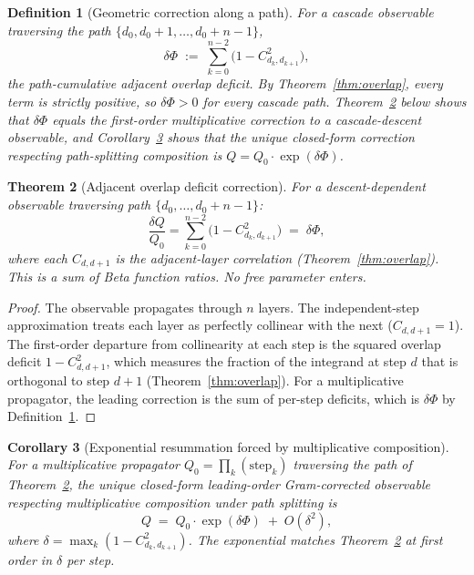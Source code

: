 \documentclass[12pt,a4paper]{article}
\newtheorem{theorem}{Theorem}[section]
\newtheorem{corollary}[theorem]{Corollary}
\newtheorem{definition}[theorem]{Definition}
\theoremstyle{remark}
\begin{document}
\begin{definition}[Geometric correction along a path]\label{def:delta-phi}
For a cascade observable traversing the path $\{d_0, d_0+1, \ldots, d_0+n-1\}$,
\[
\delta\Phi \;:=\; \sum_{k=0}^{n-2}\bigl(1 - C^2_{d_k, d_{k+1}}\bigr),
\]
the path-cumulative adjacent overlap deficit. By Theorem~\ref{thm:overlap}, every term is strictly positive, so $\delta\Phi > 0$ for every cascade path. Theorem~\ref{thm:first-order} below shows that $\delta\Phi$ equals the first-order multiplicative correction to a cascade-descent observable, and Corollary~\ref{cor:exp-resum} shows that the unique closed-form correction respecting path-splitting composition is $Q = Q_0 \cdot \exp(\delta\Phi)$.
\end{definition}

\begin{theorem}[Adjacent overlap deficit correction]\label{thm:first-order}
For a descent-dependent observable traversing path $\{d_0,\ldots,d_0+n-1\}$:
\begin{equation}\label{eq:first-order}
\frac{\delta Q}{Q_0} = \sum_{k=0}^{n-2}\bigl(1 - C_{d_k,d_{k+1}}^2\bigr) \;=\; \delta\Phi,
\end{equation}
where each $C_{d,d+1}$ is the adjacent-layer correlation (Theorem~\ref{thm:overlap}).
This is a sum of Beta function ratios. No free parameter enters.
\end{theorem}

\begin{proof}
The observable propagates through $n$ layers. The independent-step approximation treats each layer as perfectly collinear with the next ($C_{d,d+1}=1$). The first-order departure from collinearity at each step is the squared overlap deficit $1-C_{d,d+1}^2$, which measures the fraction of the integrand at step $d$ that is orthogonal to step $d+1$ (Theorem~\ref{thm:overlap}). For a multiplicative propagator, the leading correction is the sum of per-step deficits, which is $\delta\Phi$ by Definition~\ref{def:delta-phi}.
\end{proof}

\begin{corollary}[Exponential resummation forced by multiplicative composition]\label{cor:exp-resum}
For a multiplicative propagator $Q_0 = \prod_k (\text{step}_k)$
traversing the path of Theorem~\ref{thm:first-order}, the unique
closed-form leading-order Gram-corrected observable respecting
multiplicative composition under path splitting is
\begin{equation}\label{eq:exp-form}
Q \;=\; Q_0\cdot\exp(\delta\Phi) \;+\; O(\delta^2),
\end{equation}
where $\delta = \max_k (1 - C_{d_k,d_{k+1}}^2)$. The exponential
matches Theorem~\ref{thm:first-order} at first order in $\delta$ per
step.
\end{corollary}
\end{document}
